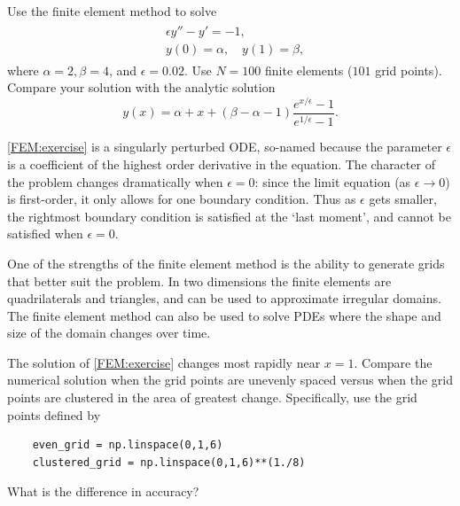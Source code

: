\begin{problem}
	Use the finite element method to solve
	\begin{align}
		\begin{split}
		&{ }\epsilon y'' - y' = -1,\\
		&{ }y(0) = \alpha, \quad y(1) = \beta,
		\end{split} \label{FEM:exercise}
	\end{align}
	where $\alpha = 2, \beta = 4$, and $\epsilon = 0.02$.  Use $N = 100$ finite elements ($101$ grid points). Compare your solution with the analytic solution
	\[
	y(x) = \alpha + x + (\beta - \alpha - 1 ) \frac{e^{x/\epsilon} -1}{e^{1/\epsilon} -1}.
	\]
	
\eqref{FEM:exercise} is a singularly perturbed ODE, so-named because the parameter $\epsilon$ is a coefficient of the highest order derivative in the equation. The character of the problem changes dramatically when $\epsilon = 0$: since the limit equation (as $\epsilon \to 0$) is first-order, it only allows for one boundary condition. Thus as $\epsilon$ gets smaller, the rightmost boundary condition is satisfied at the `last moment',  and cannot be satisfied when $\epsilon = 0$.
\end{problem}


\begin{problem}
	One of the strengths of the finite element method is the ability to generate grids that better suit the problem. In two dimensions the finite elements are quadrilaterals and triangles, and can be used to approximate irregular domains.  The finite element method can also be used to solve PDEs where the shape and size of the domain changes over time. 
	
	The solution of \eqref{FEM:exercise} changes most rapidly near $x = 1$. 
	Compare the numerical solution when the grid points are unevenly spaced versus when the grid points are clustered in the area of greatest change. Specifically, use the grid points defined by 
	\begin{lstlisting}
	even_grid = np.linspace(0,1,6)
	clustered_grid = np.linspace(0,1,6)**(1./8)
	\end{lstlisting}
What is the difference in accuracy? 
\end{problem}




